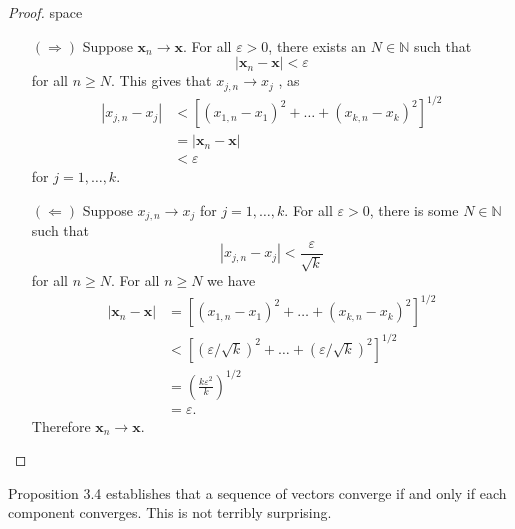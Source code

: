 \documentclass{article}
\newcommand{\N}{\mathbb{N}}
\newcommand{\x}{\mathbf{x}}
\theoremstyle{definition}
\begin{document}
\begin{proof}{\color{white}space}
	\begin{enumerate}
		\item [$ (\Longrightarrow) $] Suppose $ \x_n\to \x $. For all $ \varepsilon>0 $, there exists an $ N\in\N $ such that $$|\x_n-\x|<\varepsilon $$ for all $ n\ge N $. This gives that  $ x_{j,n}\to x_j $ , as
		\begin{align*}
	|x_{j,n}- x_j|&<\left[(x_{1,n}- x_1)^2+\ldots+(x_{k,n}- x_k)^2\right]^{1/2}\\&=|\x_n-\x|\\&<\varepsilon
		\end{align*}  for $ j=1,\ldots,k $. 
		\item [$ (\Longleftarrow) $]  Suppose $ x_{j,n}\to x_j  $ for $ j=1,\ldots,k $. For all $ \varepsilon>0 $, there is some $ N\in\N $ such that $$ |x_{j,n}-x_j|<\frac{\varepsilon}{\sqrt{k}}$$ for all $ n\ge N $. For all $ n\ge N $ we have 
		\begin{align*}
			|\x_n-\x|&=\left[(x_{1,n}- x_1)^2+\ldots+(x_{k,n}- x_k)^2\right]^{1/2}\\&<\left[(\varepsilon/\sqrt{k})^2+\ldots+(\varepsilon/\sqrt{k})^2\right]^{1/2}\\&=\left(\frac{k\varepsilon^2}{k}\right)^{1/2}\\&=\varepsilon.
		\end{align*}
	Therefore $ \x_n\to \x $.
	\end{enumerate}
\end{proof}
Proposition 3.4 establishes that a sequence of vectors converge if and only if each component converges. This is not terribly surprising. 
\end{document}
